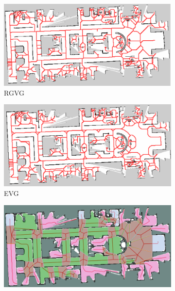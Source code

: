 \begin{figure}[h]
    \captionsetup[subfigure]{justification=centering}
    \centering
    \begin{subfigure}{.5\textwidth}
      \centering
      \includegraphics[width=\textwidth]{figures/60_results/aws_roadmap_rgvg.png}
      \caption{RGVG}
    \end{subfigure}%
    \begin{subfigure}{.5\textwidth}
      \centering
      \includegraphics[width=\textwidth]{figures/60_results/aws_roadmap_evg.png}
      \caption{EVG}
    \end{subfigure}
    \begin{subfigure}{.5\textwidth}
      \centering
      \includegraphics[width=\textwidth]{figures/60_results/aws_roadmap_semantic.png}

\end{subfigure}
\end{figure}
